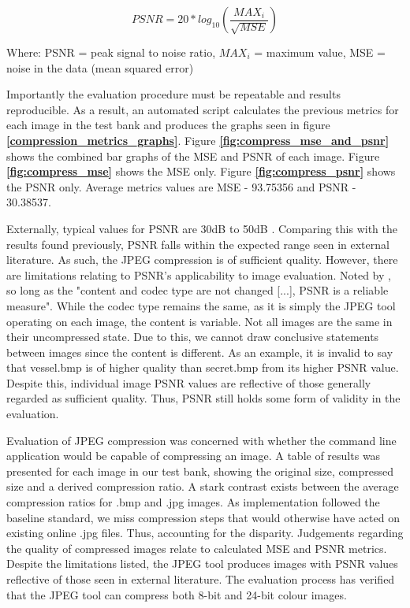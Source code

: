 \documentclass{l4proj}
\begin{document}
\[PSNR = 20 * log_{10}(\frac{MAX_{i}}{\sqrt{MSE}})\]

Where: PSNR = peak signal to noise ratio, \(MAX_{i}\) = maximum value, MSE = noise in the data (mean squared error) 

Importantly the evaluation procedure must be repeatable and results reproducible. As a result, an automated script calculates the previous metrics for each image in the test bank and produces the graphs seen in figure
\textbf{\ref{compression_metrics_graphs}}. Figure \textbf{\ref{fig:compress_mse_and_psnr}} shows the combined bar graphs of the MSE and PSNR of each image. Figure \textbf{\ref{fig:compress_mse}} shows the MSE only. Figure \textbf{\ref{fig:compress_psnr}} shows the PSNR only. Average metrics values are MSE - 93.75356 and PSNR - 30.38537. 

Externally, typical values for PSNR are 30dB to 50dB \citep{psnrquestion}. Comparing this with the results found previously, PSNR falls within the expected range seen in external literature. As such, the JPEG compression is of sufficient quality. However, there are limitations relating to PSNR's applicability to image evaluation. Noted by \citet{PSNR}, so long as the "content and codec type are not changed [...], PSNR is a reliable measure". While the codec type remains the same, as it is simply the JPEG tool operating on each image, the content is variable. Not all images are the same in their uncompressed state. Due to this, we cannot draw conclusive statements between images since the content is different. As an example, it is invalid to say that vessel.bmp is of higher quality than secret.bmp from its higher PSNR value. Despite this, individual image PSNR values are reflective of those generally regarded as sufficient quality. Thus, PSNR still holds some form of validity in the evaluation.

Evaluation of JPEG compression was concerned with whether the command line application would be capable of compressing an image. A table of results was presented for each image in our test bank, showing the original size, compressed size and a derived compression ratio. A stark contrast exists between the average compression ratios for .bmp and .jpg images. As implementation followed the baseline standard, we miss compression steps that would otherwise have acted on existing online .jpg files. Thus, accounting for the disparity. Judgements regarding the quality of compressed images relate to calculated MSE and PSNR metrics. Despite the limitations listed, the JPEG tool produces images with PSNR values reflective of those seen in external literature. The evaluation process has verified that the JPEG tool can compress both 8-bit and 24-bit colour images.
\end{document}
